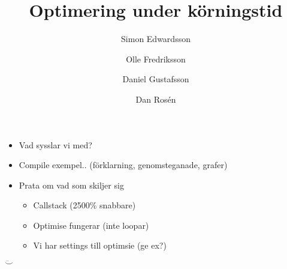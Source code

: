 \documentclass{beamer}
\begin{document}
\title{Optimering under körningstid}


\author{Simon Edwardsson \and Olle Fredriksson
\and \linebreak{}
Daniel Gustafsson \and Dan Rosén}



\begin{frame}
    \titlepage
\end{frame}


\begin{frame}
\begin{itemize}
	\item Vad sysslar vi med?
	\item Compile exempel.. (förklarning, genomsteganade, grafer)
	\item Prata om vad som skiljer sig
	\begin{itemize}
		\item Callstack (2500\% snabbare)
		\item Optimise fungerar (inte loopar)
		\item Vi har settings till optimsie (ge ex?)
	\end{itemize}
\end{itemize}
    $\ddot\smile$ 
\end{frame}
\end{document}
